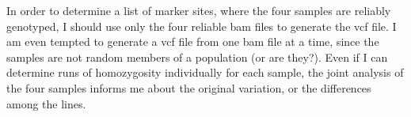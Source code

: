 \documentclass[a4paper,12pt]{article}
\begin{document}
In order to determine a list of marker sites, where the four samples are reliably genotyped, I should use only the four reliable bam files to generate the vcf file. I am even tempted to generate a vcf file from one bam file at a time, since the samples are not random members of a population (or are they?). Even if I can determine runs of homozygosity individually for each sample, the joint analysis of the four samples informs me about the original variation, or the differences among the lines.



\end{document}
